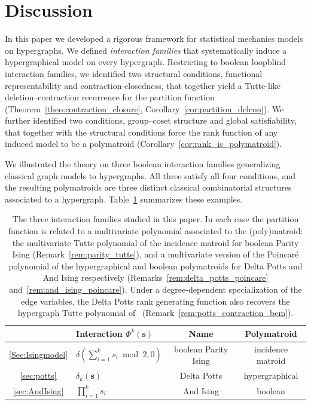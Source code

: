 \documentclass[11pt,reqno]{amsart}
\newcommand{\vecs}{\boldsymbol{s}}
\theoremstyle{plain}
\theoremstyle{definition}
\numberwithin{equation}{section}
\begin{document}
\section{Discussion}
\label{sec:discussion}
In this paper we developed a rigorous framework for statistical mechanics models on hypergraphs. We defined \emph{interaction families} that systematically induce a hypergraphical model on every hypergraph. Restricting to boolean loopblind interaction families, we identified two structural conditions, functional representability and contraction-closedness, that together yield a Tutte-like deletion--contraction recurrence for the partition function (Theorem~\ref{theo:contraction_closure}, Corollary~\ref{cor:partition_delcon}). We further identified two conditions, group--coset structure and global satisfiability, that together with the structural conditions force the rank function of any induced model to be a polymatroid (Corollary~\ref{cor:rank_is_polymatroid}).

We illustrated the theory on three boolean interaction families generalizing classical graph models to hypergraphs. All three satisfy all four conditions, and the resulting polymatroids are three distinct classical combinatorial structures associated to a hypergraph. Table~\ref{tab:models} summarizes these examples.

\begin{table}[ht]
\centering
\caption{The three interaction families studied in this paper. In each case the partition function is related to a multivariate polynomial associated to the (poly)matroid: the multivariate Tutte polynomial of the incidence matroid for boolean Parity Ising (Remark~\ref{rem:parity_tutte}), and a multivariate version of the Poincar\'e polynomial of the hypergraphical and boolean polymatroids for Delta Potts and And Ising respectively (Remarks~\ref{rem:delta_potts_poincare} and~\ref{rem:and_ising_poincare}). Under a degree-dependent specialization of the edge variables, the Delta
Potts rank generating function also recovers the hypergraph Tutte
polynomial of~\cite{Berrekkal2026}
(Remark~\ref{rem:potts_contraction_bem}).}
\label{tab:models}
\renewcommand{\arraystretch}{1.4}
\begin{tabular}{c l c c}
\hline\hline
 & Interaction $\Phi^k(\vecs)$
 & Name
 & Polymatroid \\
\hline
\ref{Sec:Isingmodel}
 & $\delta(\sum_{i=1}^k s_i \bmod 2,0)$
 & boolean Parity Ising
 & incidence matroid \\[4pt]
\ref{sec:potts}
 & $\delta_k(\vecs)$
 & Delta Potts
 & hypergraphical \\[4pt]
\ref{sec:AndIsing}
 & $\displaystyle\prod_{i=1}^{k} s_i$
 & And Ising
 & boolean \\
\hline\hline
\end{tabular}
\end{table}
\end{document}
